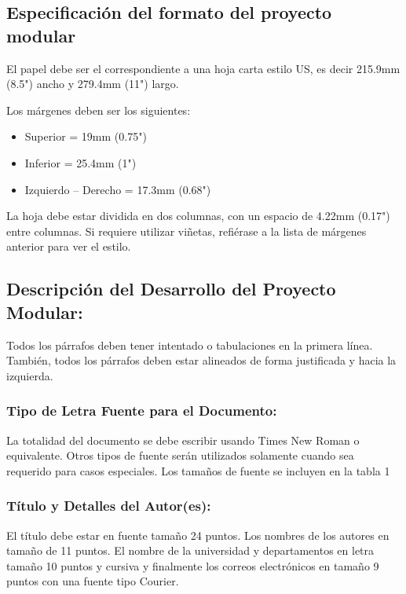 \documentclass[10pt,twocolumn,letterpaper]{article}
\begin{document}
\subsection{Especificación del formato del proyecto modular}
El papel debe ser el correspondiente a una hoja carta estilo US, es decir 215.9mm (8.5") ancho y 279.4mm (11") largo.

Los márgenes deben ser los siguientes:

\begin{itemize}
	\item Superior = 19mm (0.75")
	\item Inferior = 25.4mm (1")
	\item Izquierdo – Derecho = 17.3mm (0.68")
\end{itemize}

La hoja debe estar dividida en dos columnas, con un espacio de 4.22mm (0.17") entre columnas.
Si requiere utilizar viñetas, refiérase a la lista de márgenes anterior para ver el estilo.

\subsection{Descripción del Desarrollo del Proyecto Modular:\;}
Todos los párrafos deben tener intentado o tabulaciones en la primera línea. También, todos los párrafos deben estar alineados de forma justificada y hacia la izquierda.

\subsubsection{Tipo de Letra Fuente para el Documento:\;}
La totalidad del documento se debe escribir usando Times New Roman o equivalente. Otros tipos de fuente serán utilizados solamente cuando sea requerido para casos especiales.
Los tamaños de fuente se incluyen en la tabla 1

\subsubsection{Título y Detalles del Autor(es):\;}
El título debe estar en fuente tamaño 24 puntos. Los nombres de los autores en tamaño de 11 puntos. El nombre de la universidad y departamentos en letra tamaño 10 puntos y cursiva y finalmente los correos electrónicos en tamaño 9 puntos con una fuente tipo Courier.
\end{document}
